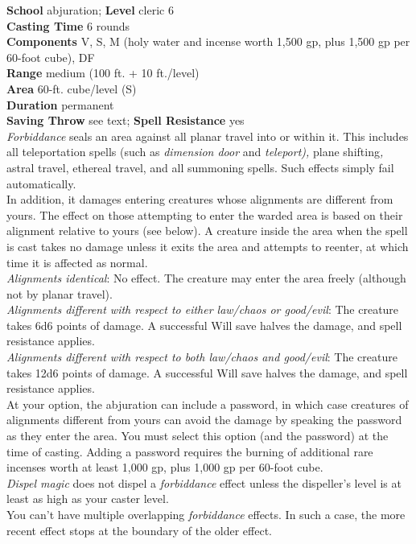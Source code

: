 \textbf{School} abjuration; \textbf{Level} cleric 6\\
\textbf{Casting Time} 6 rounds\\
\textbf{Components} V, S, M (holy water and incense worth 1,500 gp, plus 1,500 gp per 60-foot cube), DF\\
\textbf{Range }medium (100 ft. + 10 ft./level)\\
\textbf{Area} 60-ft. cube/level (S)\\
\textbf{Duration} permanent\\
\textbf{Saving Throw} see text; \textbf{Spell Resistance} yes\\
\textit{Forbiddance }seals an area against all planar travel into or within it. This includes all teleportation spells (such as \textit{dimension door }and \textit{teleport), }plane shifting\textit{, }astral travel, ethereal travel, and all summoning spells. Such effects simply fail automatically.\\
In addition, it damages entering creatures whose alignments are different from yours. The effect on those attempting to enter the warded area is based on their alignment relative to yours (see below). A creature inside the area when the spell is cast takes no damage unless it exits the area and attempts to reenter, at which time it is affected as normal.\\
\textit{Alignments identical}: No effect. The creature may enter the area freely (although not by planar travel).\\
\textit{Alignments different with respect to either law/chaos or good/evil}: The creature takes 6d6 points of damage. A successful Will save halves the damage, and spell resistance applies.\\
\textit{Alignments different with respect to both law/chaos and good/evil}: The creature takes 12d6 points of damage. A successful Will save halves the damage, and spell resistance applies.\\
At your option, the abjuration can include a password, in which case creatures of alignments different from yours can avoid the damage by speaking the password as they enter the area. You must select this option (and the password) at the time of casting. Adding a password requires the burning of additional rare incenses worth at least 1,000 gp, plus 1,000 gp per 60-foot cube.\\
\textit{Dispel magic }does not dispel a \textit{forbiddance }effect unless the dispeller's level is at least as high as your caster level.\\
You can't have multiple overlapping \textit{forbiddance }effects. In such a case, the more recent effect stops at the boundary of the older effect.\\
